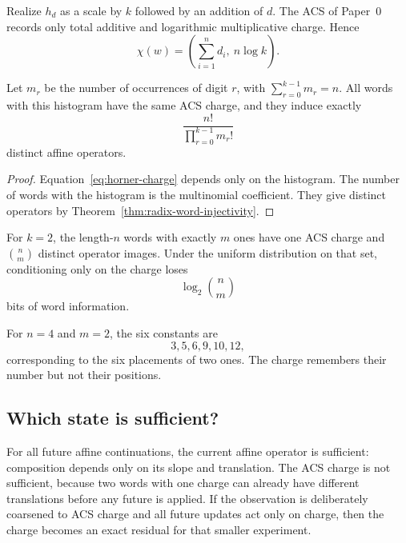 Realize $h_d$ as a scale by $k$ followed by an addition of $d$.  The ACS of
Paper~0~\cite{Yuan2026AEGPaperZero} records only total additive and
logarithmic multiplicative charge.  Hence
\begin{equation}
  \chi(w)=\left(\sum_{i=1}^{n}d_i,\ n\log k\right).
  \label{eq:horner-charge}
\end{equation}

\begin{theorem}
\label{thm:horner-histogram-count}
Let $m_r$ be the number of occurrences of digit $r$, with
$\sum_{r=0}^{k-1}m_r=n$.  All words with this histogram have the same ACS
charge, and they induce exactly
\begin{equation}
  \frac{n!}{\prod_{r=0}^{k-1}m_r!}
  \label{eq:multinomial-horner-count}
\end{equation}
distinct affine operators.
\end{theorem}

\begin{proof}
Equation~\eqref{eq:horner-charge} depends only on the histogram.  The number of
words with the histogram is the multinomial coefficient.  They give distinct
operators by Theorem~\ref{thm:radix-word-injectivity}.
\end{proof}

\begin{corollary}
\label{cor:binary-horner-count}
For $k=2$, the length-$n$ words with exactly $m$ ones have one ACS charge and
$\binom nm$ distinct operator images.  Under the uniform distribution on that
set, conditioning only on the charge loses
\[
  \log_2\binom nm
\]
bits of word information.
\end{corollary}

For $n=4$ and $m=2$, the six constants are
\[
  3,5,6,9,10,12,
\]
corresponding to the six placements of two ones.  The charge remembers their
number but not their positions.

\subsection{Which state is sufficient?}

For all future affine continuations, the current affine operator is sufficient:
composition depends only on its slope and translation.  The ACS charge is not
sufficient, because two words with one charge can already have different
translations before any future is applied.  If the observation is deliberately
coarsened to ACS charge and all future updates act only on charge, then the
charge becomes an exact residual for that smaller experiment.

